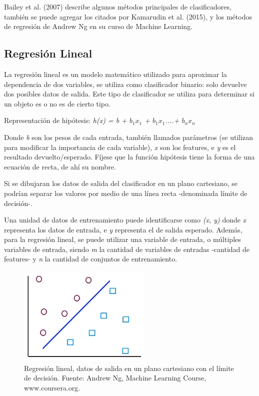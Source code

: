 \documentclass[a4paper,12pt,oneside,spanish]{book}
\begin{document}
Bailey et al. (2007) describe algunos métodos principales de clasificadores, también se puede agregar los citados por Kamarudin et al. (2015), y los métodos de regresión de Andrew Ng en su curso de Machine Learning. \par

\subsection{Regresión Lineal}

La regresión lineal es un modelo matemático utilizado para aproximar la dependencia de dos variables, se utiliza como clasificador binario: solo devuelve dos posibles datos de salida. Este tipo de clasificador se utiliza para determinar si un objeto es o no es de cierto tipo. \par
Representación de hipótesis: \textit{h(x) = b + $b_1$$x_1$ + $b_1$$x_1$....+ $b_n$$x_n$}
	
Donde \textit{b} son los pesos de cada entrada, también llamados parámetros (se utilizan para modificar la importancia de cada variable), \textit{x} son los features, e \textit{y} es el resultado devuelto/esperado. Fíjese que la función hipótesis tiene la forma de una ecuación de recta, de ahí su nombre. \par


Si se dibujaran los datos de salida del clasificador en un plano cartesiano, se podrían separar los valores por medio de una línea recta -denominada límite de decisión-. \par

Una unidad de datos de entrenamiento puede identificarse como \textit{(x, y)} donde \textit{x} representa los datos de entrada, e \textit{y} representa el de salida esperado. Además, para la regresión lineal, se puede utilizar una variable de entrada, o múltiples variables de entrada, siendo \textit{m} la cantidad de variables de entradas -cantidad de features- y \textit{n} la cantidad de conjuntos de entrenamiento.  \par

\begin{figure}[h!]
	\includegraphics[width=180pt]{Imagenes/regresion1.jpg}
	\centering
	\caption{Regresión lineal, datos de salida en un plano cartesiano con el límite de decisión. Fuente: Andrew Ng, Machine Learning Course, www.coursera.org.}
	\label{fig:regresion1}
\end{figure}
\end{document}

